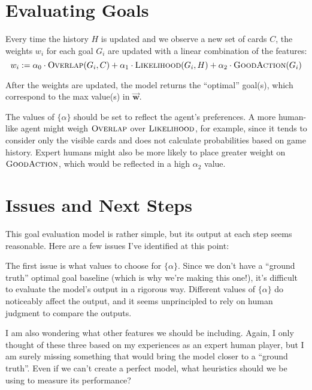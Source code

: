 \documentclass[11pt]{article}
\newcommand{\bvec}[1]{\vec{\mathbf{#1}}}
\newcommand{\overlap}{\textsc{Overlap}}
\newcommand{\lkhd}{\textsc{Likelihood}}
\newcommand{\goodaction}{\textsc{GoodAction}}
\begin{document}
\section{Evaluating Goals}

Every time the history $H$ is updated and we observe a new set of cards $C$, the weights $w_i$ for each goal $G_i$ are updated with a linear combination of the features:
\begin{equation}
  w_i := \alpha_0 \cdot \overlap(G_i,C) + \alpha_1 \cdot \lkhd(G_i,H) + \alpha_2 \cdot \goodaction(G_i)
\label{eq:w-update} \end{equation}

After the weights are updated, the model returns the ``optimal'' goal(s), which correspond to the max value(s) in $\bvec{w}$.

The values of $\{\alpha\}$ should be set to reflect the agent's preferences. A more human-like agent might weigh $\overlap$ over $\lkhd$, for example, since it tends to consider only the visible cards and does not calculate probabilities based on game history. Expert humans might also be more likely to place greater weight on $\goodaction$, which would be reflected in a high $\alpha_2$ value.

\section{Issues and Next Steps}

This goal evaluation model is rather simple, but its output at each step seems reasonable. Here are a few issues I've identified at this point:

The first issue is what values to choose for $\{\alpha\}$. Since we don't have a ``ground truth'' optimal goal baseline (which is why we're making this one!), it's difficult to evaluate the model's output in a rigorous way. Different values of $\{\alpha\}$ do noticeably affect the output, and it seems unprincipled to rely on human judgment to compare the outputs.

I am also wondering what other features we should be including. Again, I only thought of these three based on my experiences as an expert human player, but I am surely missing something that would bring the model closer to a ``ground truth''. Even if we can't create a perfect model, what heuristics should we be using to measure its performance?
\end{document}
